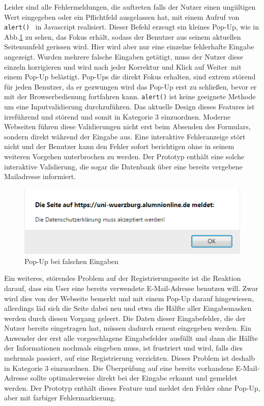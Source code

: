 { Leider sind alle Fehlermeldungen, die auftreten falls der Nutzer einen ungültigen Wert eingegeben oder ein Pflichtfeld ausgelassen hat, mit einem Aufruf von \glqq \texttt{alert()}\grqq ~ in Javascript realisiert. Dieser Befehl erzeugt ein kleines Pop-Up, wie in Abb.\ref{fig:regpopup} zu sehen, das Fokus erhält, sodass der Benutzer aus seinem aktuellen Seitenumfeld gerissen wird. Hier wird aber nur eine einzelne fehlerhafte Eingabe angezeigt. Wurden mehrere falsche Eingaben getätigt, muss der Nutzer diese einzeln korrigieren und wird nach jeder Korrektur und Klick auf \glqq Weiter\grqq ~mit einem Pop-Up belästigt.
}
{ Pop-Ups die direkt Fokus erhalten, sind extrem störend für jeden Benutzer, da er gezwungen wird das Pop-Up erst zu schließen, bevor er mit der Browserbedienung fortfahren kann. \texttt{alert()} ist keine geeignete Methode um eine Inputvalidierung durchzuführen. Das aktuelle Design dieses Features ist irreführend und störend und somit in Kategorie 3 einzuordnen.
}
{ Moderne Webseiten führen diese Validierungen nicht erst beim Absenden des Formulars, sondern direkt während der Eingabe aus. Eine interaktive Fehleranzeige stört nicht und der Benutzer kann den Fehler sofort berichtigen ohne in seinem weiteren Vorgehen unterbrochen zu werden. Der Prototyp enthält eine solche interaktive Validierung, die sogar die Datenbank über eine bereits vergebene Mailadresse informiert.}
\begin{figure}
	\centering
		\includegraphics{figures/regpopup.png}
	\caption{Pop-Up bei falschen Eingaben}
	\label{fig:regpopup}
\end{figure}

{ Ein weiteres, störendes Problem auf der Registrierungsseite ist die Reaktion darauf, dass ein User eine bereits verwendete E-Mail-Adresse benutzen will. Zwar wird dies von der Webseite bemerkt und mit einem Pop-Up darauf hingewiesen, allerdings läd sich die Seite dabei neu und etwa die Hälfte aller Eingabemasken werden durch diesen Vorgang geleert. Die Daten dieser Eingabefelder, die der Nutzer bereits eingetragen hat, müssen dadurch erneut eingegeben werden.
}
{ Ein Anwender der erst alle vorgeschlagene Eingabefelder ausfüllt und dann die Hälfte der Informationen nochmals eingeben muss, ist frustriert und wird, falls dies mehrmals passiert, auf eine Registrierung verzichten. Dieses Problem ist deshalb in Kategorie 3 einzuordnen.
}
{ Die Überprüfung auf eine bereits vorhandene E-Mail-Adresse sollte optimalerweise direkt bei der Eingabe erkannt und gemeldet werden. Der Prototyp enthält dieses Feature und meldet den Fehler ohne Pop-Up, aber mit farbiger Fehlermarkierung.
}  

